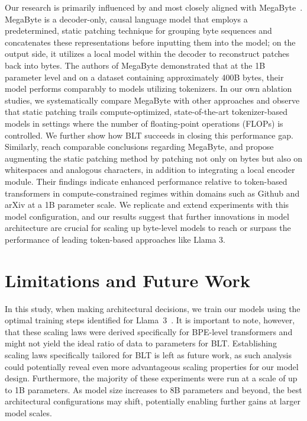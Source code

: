 Our research is primarily influenced by and most closely aligned with MegaByte~\citep{yu2023megabyte}. MegaByte is a decoder-only, causal language model that employs a predetermined, static patching technique for grouping byte sequences and concatenates these representations before inputting them into the model; on the output side, it utilizes a local model within the decoder to reconstruct patches back into bytes. The authors of MegaByte demonstrated that at the 1B parameter level and on a dataset containing approximately 400B bytes, their model performs comparably to models utilizing tokenizers. In our own ablation studies, we systematically compare MegaByte with other approaches and observe that static patching trails compute-optimized, state-of-the-art tokenizer-based models in settings where the number of floating-point operations (FLOPs) is controlled. We further show how {\textsc BLT} succeeds in closing this performance gap. Similarly, \cite{slagle2024spacebyte} reach comparable conclusions regarding MegaByte, and propose augmenting the static patching method by patching not only on bytes but also on whitespaces and analogous characters, in addition to integrating a local encoder module. Their findings indicate enhanced performance relative to token-based transformers in compute-constrained regimes within domains such as Github and arXiv at a 1B parameter scale. We replicate and extend experiments with this model configuration, and our results suggest that further innovations in model architecture are crucial for scaling up byte-level models to reach or surpass the performance of leading token-based approaches like Llama 3.

\section{Limitations and Future Work}

In this study, when making architectural decisions, we train our models using the optimal training steps identified for Llama~3~\citep{dubey2024llama}. It is important to note, however, that these scaling laws were derived specifically for BPE-level transformers and might not yield the ideal ratio of data to parameters for {\textsc BLT}. Establishing scaling laws specifically tailored for {\textsc BLT} is left as future work, as such analysis could potentially reveal even more advantageous scaling properties for our model design. Furthermore, the majority of these experiments were run at a scale of up to 1B parameters. As model size increases to 8B parameters and beyond, the best architectural configurations may shift, potentially enabling further gains at larger model scales.

